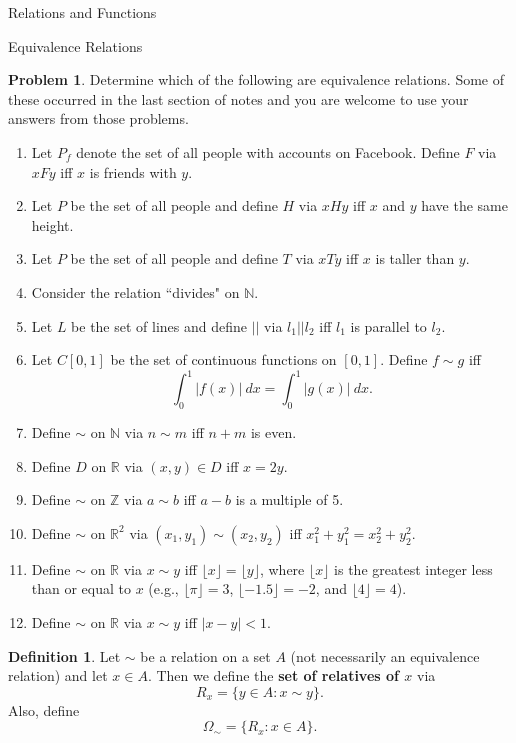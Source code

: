 \documentclass[11pt]{article}
\theoremstyle{definition}
\newtheorem{definition}[theorem]{Definition}
\newtheorem{problem}[theorem]{Problem}
\begin{document}
\begin{section}{Relations and Functions}
\begin{subsection}{Equivalence Relations}
\begin{problem}
Determine which of the following are equivalence relations.  Some of these occurred in the last section of notes and you are welcome to use your answers from those problems.

\begin{enumerate}\label{exer:lots of them}
\item\label{exer:facebook} Let $P_f$ denote the set of all people with accounts on Facebook.  Define  $F$ via $xFy$ iff $x$ is friends with $y$. 
\item Let $P$ be the set of all people and define $H$ via $xHy$ iff $x$ and $y$ have the same height.
\item Let $P$ be the set of all people and define $T$ via $xTy$ iff $x$ is taller than $y$.
\item Consider the relation ``divides" on $\mathbb{N}$.
\item Let $L$ be the set of lines and define $||$ via $l_1||l_2$ iff $l_1$ is parallel to $l_2$.
\item Let $C[0,1]$ be the set of continuous functions on $[0,1]$.  Define $f\sim g$ iff
\[
\int_0^1|f(x)|\ dx=\int_0^1|g(x)|\ dx.
\]
\item Define $\sim$ on $\mathbb{N}$ via $n\sim m$ iff $n+m$ is even.
\item Define $D$ on $\mathbb{R}$ via $(x,y)\in D$ iff $x=2y$.
\item\label{exer:mod 5} Define $\sim$ on $\mathbb{Z}$ via $a\sim b$ iff $a-b$ is a multiple of 5.
\item Define $\sim$ on $\mathbb{R}^2$ via $(x_1,y_1)\sim (x_2,y_2)$ iff $x_1^2+y_1^2=x_2^2+y_2^2$.
\item Define $\sim$ on $\mathbb{R}$ via $x\sim y$ iff $\lfloor x\rfloor =\lfloor y\rfloor$, where $\lfloor x\rfloor$ is the greatest integer less than or equal to $x$ (e.g., $\lfloor \pi\rfloor=3$, $\lfloor -1.5\rfloor=-2$, and $\lfloor 4\rfloor=4$).
\item Define $\sim$ on $\mathbb{R}$ via $x \sim y$ iff $|x-y|<1$.
\end{enumerate}
\end{problem}

\begin{definition}
Let $\sim$ be a relation on a set $A$ (not necessarily an equivalence relation) and let $x\in A$.  Then we define the \textbf{set of relatives of $x$} via
\[
R_x=\{y\in A: x\sim y\}.
\]
Also, define
\[
\Omega_{\sim}=\{R_x:x\in A\}.
\]
\end{definition}


\end{subsection}
\end{section}
\end{document}
